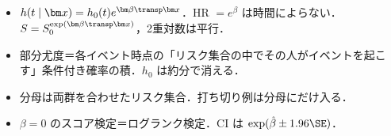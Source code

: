 \begin{summarybox}
\begin{itemize}
\item $h(t\mid\bm x)=h_0(t)e^{\bm\beta\transp\bm x}$．HR $=e^\beta$ は時間によらない．$S=S_0^{\exp(\bm\beta\transp\bm x)}$，2重対数は平行．
\item 部分尤度＝各イベント時点の「リスク集合の中でその人がイベントを起こす」条件付き確率の積．$h_0$ は約分で消える．
\item 分母は両群を合わせたリスク集合．打ち切り例は分母にだけ入る．
\item $\beta=0$ のスコア検定＝ログランク検定．CI は $\exp(\hat\beta\pm1.96\SE)$．
\end{itemize}
\end{summarybox}
